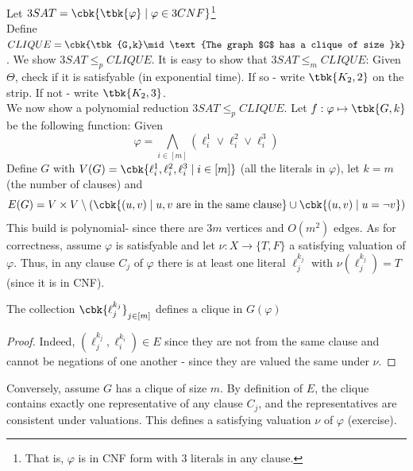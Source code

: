 \begin{example}
	Let $3SAT = \cbk{\tbk{\varphi}\mid \varphi\in 3CNF}$\footnote{That is, $\varphi$ is in CNF form with $3$ literals in any clause.}\\
	Define $CLIQUE = \cbk{\tbk{G,k}\mid \text{The graph $G$ has a clique of size }k}$. We show $3SAT\leq_p CLIQUE$. It is easy to show that $3SAT\leq_m CLIQUE$: Given $\Theta$, check if it is satisfyable (in exponential time). If so - write $\tbk{K_2,2}$ on the strip. If not - write $\tbk{K_2,3}$.\\ 
	We now show a polynomial reduction $3SAT\leq_p CLIQUE$. Let $f:\varphi\mapsto \tbk{G,k}$ be the following function: Given 
	\[
	\varphi = \bigwedge_{i\in [m]}(\ell_i^1\vee \ell_i^2 \vee \ell_i^3)
	\]
	Define $G$ with $V(G) = \cbk{\ell_i^1,\ell_i^2,\ell_i^3\mid i\in [m]}$ (all the literals in $\varphi$), let $k = m$ (the number of clauses) and \[E(G) = V\times V\setminus \left(\cbk{(u,v)\mid u,v\text{ are in the same clause}}\cup \cbk{(u,v)\mid u = \neg v}\right)\]
	This build is polynomial- since there are $3m$ vertices and $O(m^2)$ edges. As for correctness, assume $\varphi$ is satisfyable and let $\nu:X\to \{T,F\}$ a satisfying valuation of $\varphi$. Thus, in any clause $C_j$ of $\varphi$ there is at least one literal $\ell^{k_j}_j$ with $\nu(\ell^{k_j}_j) = T$ (since it is in CNF). 
	\begin{prop}
		The collection $\cbk{\ell_j^{k_j}}_{j\in[m]}$ defines a clique in $G(\varphi)$
	\end{prop}
\begin{proof}
	Indeed, $(\ell^{k_{j}}_{j}, \ell^{k_i}_i)\in E$ since they are not from the same clause and cannot be negations of one another - since they are valued the same under $\nu$.
\end{proof}
Conversely, assume $G$ has a clique of size $m$. By definition of $E$, the clique contains exactly one representative of any clause $C_j$, and the representatives are consistent under valuations. This defines a satisfying valuation $\nu$ of $\varphi$ (exercise).\\


\end{example}
